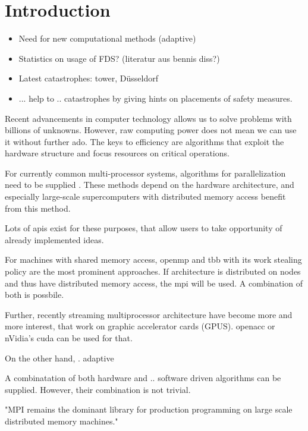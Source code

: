 \chapter{Introduction}
\label{ch:introduction}

\begin{itemize}
  \item Need for new computational methods (adaptive)
  \item Statistics on usage of FDS? (literatur aus bennis diss?)
  
  \item Latest catastrophes: tower, Düsseldorf
  \item ... help to .. catastrophes by giving hints on placements of safety measures.
\end{itemize}

Recent advancements in computer technology allows us to solve problems with billions of unknowns. However, raw computing power does not mean we can use it without further ado. The keys to efficiency are algorithms that exploit the hardware structure and focus resources on critical operations.

For currently common multi-processor systems, algorithms for parallelization need to be supplied . These methods depend on the hardware architecture, and especially large-scale supercomputers with distributed memory access benefit from this method.

Lots of \glspl{api} exist for these purposes, that allow users to take opportunity of already implemented ideas.

For machines with shared memory access, \gls{openmp} \textcite{openmp50} and \gls{tbb} \textcite{tbb2018} with its work stealing policy are the most prominent approaches. If architecture is distributed on nodes and thus have distributed memory access, the \gls{mpi} \textcite{mpi31} will be used. A combination of both is possbile.

Further, recently streaming multiprocessor architecture have become more and more interest, that work on graphic accelerator cards (GPUS). \gls{openacc} \textcite{openacc27} or nVidia's \gls{cuda} \textcite{cuda10} can be used for that.

On the other hand, . adaptive

A combinatation of both hardware and .. software driven algorithms can be supplied. However, their combination is not trivial. 

"MPI remains the dominant library for production programming on large scale distributed memory machines."

